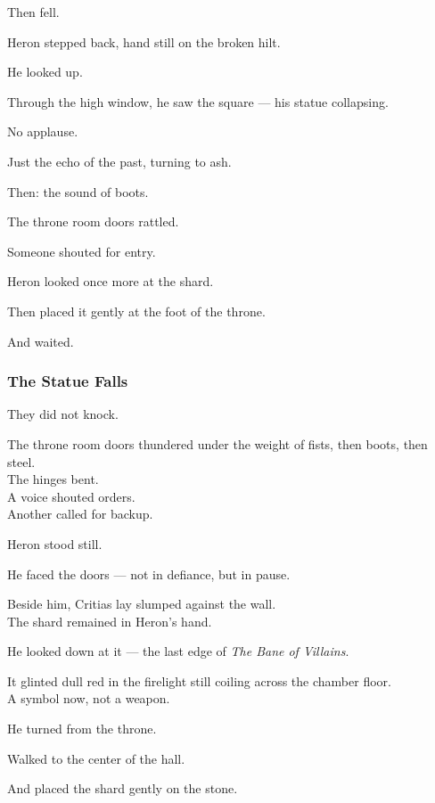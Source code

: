 \documentclass[12pt]{article}
\begin{document}
Then fell.

\vspace{1em}

Heron stepped back, hand still on the broken hilt.

He looked up.

Through the high window, he saw the square — his statue collapsing.

No applause.

Just the echo of the past, turning to ash.

Then: the sound of boots.

The throne room doors rattled.

Someone shouted for entry.

Heron looked once more at the shard.

Then placed it gently at the foot of the throne.

And waited.

\dotfill

\subsubsection{The Statue Falls}

They did not knock.

The throne room doors thundered under the weight of fists, then boots, then steel.\\
The hinges bent.\\
A voice shouted orders.\\
Another called for backup.

Heron stood still.

He faced the doors — not in defiance, but in pause.

Beside him, Critias lay slumped against the wall.\\
The shard remained in Heron’s hand.

\vspace{1em}

He looked down at it — the last edge of \textit{The Bane of Villains}.

It glinted dull red in the firelight still coiling across the chamber floor.\\
A symbol now, not a weapon.

He turned from the throne.

Walked to the center of the hall.

And placed the shard gently on the stone.

\vspace{1em}
\end{document}
